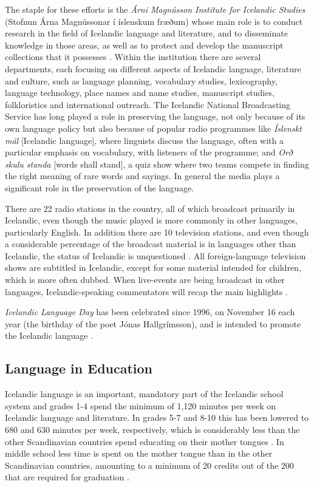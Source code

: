 \begin{multicols}{2}
The staple for these efforts is the \textit{Árni Magnússon Institute for Icelandic Studies} (Stofnun Árna Magnússonar í íslenskum fræðum) whose main role is to conduct research in the field of Icelandic language and literature, and to disseminate knowledge in those areas, as well as to protect and develop the manuscript collections that it possesses \cite{alt2}.  Within the institution there are several departments, each focusing on different aspects of Icelandic language, literature and culture, such as language planning, vocabulary studies, lexicography, language technology, place names and name studies, manuscript studies, folkloristics and international outreach.
The Icelandic National Broadcasting Service has long played a role in preserving the language, not only because of its own language policy but also because of popular radio programmes like \textit{Íslenskt mál} {[}Icelandic language{]}, where linguists discuss the language, often with a particular emphasis on vocabulary, with listeners of the programme; and \textit{Orð skulu standa} {[}words shall stand{]}, a quiz show where two teams compete in finding the right meaning of rare words and sayings. In general the media plays a significant role in the preservation of the language.

There are 22 radio stations in the country, all of which broadcast primarily in Icelandic, even though the music played is more commonly in other languages, particularly English. In addition there are 10 television stations, and even though a considerable percentage of the broadcast material is in languages other than Icelandic, the status of Icelandic is unquestioned \cite{hag2}.  All foreign-language television shows are subtitled in Icelandic, except for some material intended for children, which is more often dubbed. When live-events are being broadcast in other languages, Icelandic-speaking commentators will recap the main highlights \cite{alt3}. 

\textit{Icelandic Language Day} has been celebrated since 1996, on November 16 each year (the birthday of the poet Jónas Hallgrímsson), and is intended to promote the Icelandic language \cite{men1}.

\subsection{Language in Education}

Icelandic language is an important, mandatory part of the Icelandic school system and grades 1-4 spend the minimum of 1,120 minutes per week on Icelandic language and literature. In grades 5-7 and 8-10 this has been lowered to 680 and 630 minutes per week, respectively, which is considerably less than the other Scandinavian countries spend educating on their mother tongues \cite{men2}.  In middle school less time is spent on the mother tongue than in the other Scandinavian countries, amounting to a minimum of 20 credits out of the 200 that are required for graduation \cite{men3}.


\end{multicols}
